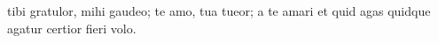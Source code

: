


 tibi gratulor, mihi gaudeo; te amo, tua tueor; a te amari et quid agas quidque agatur certior fieri volo.
